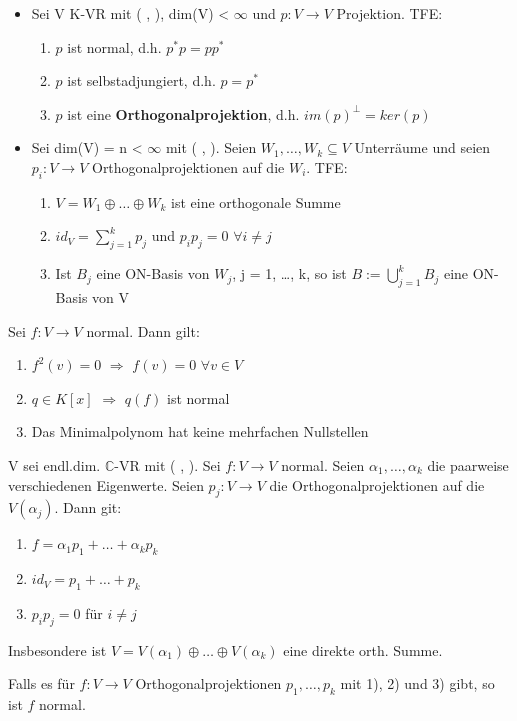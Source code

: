 \begin{theorem}
\leavevmode
\begin{itemize}
\item Sei V K-VR mit ( , ), dim(V) < $\infty$ und $p: V \to V$ Projektion. TFE:
\begin{enumerate}
\item $p$ ist normal, d.h. $p^*p = pp^*$
\item $p$ ist selbstadjungiert, d.h. $p = p^*$
\item $p$ ist eine \textbf{Orthogonalprojektion}, d.h. $im(p)^\perp = ker(p)$
\end{enumerate}
\item Sei dim(V) = n < $\infty$ mit ( , ). Seien $W_1, …, W_k \subseteq V$ Unterräume und seien $p_i: V \to V$ Orthogonalprojektionen auf die $W_i$. TFE:
\begin{enumerate}
\item $V = W_1 \oplus … \oplus W_k$ ist eine orthogonale Summe
\item $id_V = \sum\limits_{j=1}^k p_j$ und $p_ip_j = 0$ $\forall i \neq j$
\item Ist $B_j$ eine ON-Basis von $W_j$, j = 1, …, k, so ist $B := \bigcup\limits_{j=1}^k B_j$ eine ON-Basis von V 
\end{enumerate}
\end{itemize}
\end{theorem}

\begin{lemma}
Sei $f: V \to V$ normal. Dann gilt:
\begin{enumerate}
	\item $f^2(v) = 0$ $\Rightarrow$ $f(v) = 0$ $\forall v \in V$
	\item $q \in K[x]$ $\Rightarrow$ $q(f)$ ist normal
	\item Das Minimalpolynom hat keine mehrfachen Nullstellen
\end{enumerate}
\end{lemma}

\begin{theorem}
V sei endl.dim. $\mathbb{C}$-VR mit ( , ). Sei $f: V \to V$ normal. Seien $\alpha_1, …, \alpha_k$ die paarweise verschiedenen Eigenwerte. Seien $p_j: V \to V$ die Orthogonalprojektionen auf die $V(\alpha_j)$. Dann git:
\begin{enumerate}
\item $f = \alpha_1p_1 + … + \alpha_kp_k$
\item $id_V = p_1 + … + p_k$
\item $p_ip_j = 0$ für $i \neq j$
\end{enumerate}
Insbesondere ist $V = V(\alpha_1) \oplus … \oplus V(\alpha_k)$ eine direkte orth. Summe.
\end{theorem}

\begin{remark}
Falls es für $f: V \to V$ Orthogonalprojektionen $p_1, …, p_k$ mit 1), 2) und 3) gibt, so ist $f$ normal.
\end{remark}

